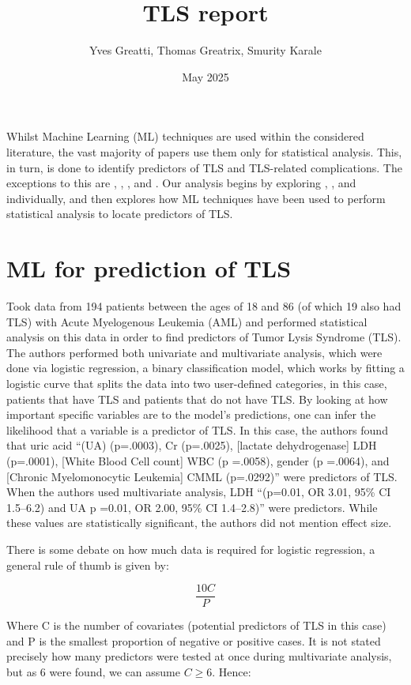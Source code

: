 \documentclass{article}
\title{TLS report}
\author{Yves Greatti, Thomas Greatrix, Smurity Karale}
\date{May 2025}
\begin{document}
\maketitle

Whilst Machine Learning (ML) techniques are used within the considered literature, the vast majority of papers use them only for statistical analysis. This, in turn, is done to identify predictors of TLS and TLS-related complications. The exceptions to this are ,  \cite{montesinos2008tumor}, \cite{mato2004predictive}, and  \cite{xiao2024prediction}. Our analysis begins by exploring \cite{montesinos2008tumor}, 
\cite{xiao2024prediction}, and  \cite{mato2004predictive} individually, and then explores how ML techniques have been used to perform statistical analysis to locate predictors of TLS.

\section{ML for prediction of TLS}

\cite{montesinos2008tumor} Took data from 194 patients between the ages of 18 and 86 (of which 19 also had TLS) with Acute Myelogenous Leukemia (AML) and performed statistical analysis on this data in order to find predictors of Tumor Lysis Syndrome (TLS). The authors performed both univariate and multivariate analysis, which were done via logistic regression, a binary classification model, which works by fitting a logistic curve that splits the data into two user-defined categories, in this case, patients that have TLS and patients that do not have TLS. By looking at how important specific variables are to the model’s predictions, one can infer the likelihood that a variable is a predictor of TLS. In this case, the authors found that uric acid “(UA) (p=.0003), Cr (p=.0025), [lactate dehydrogenase] LDH (p=.0001), [White Blood Cell count] WBC (p =.0058), gender (p =.0064), and [Chronic Myelomonocytic Leukemia] CMML (p=.0292)” were predictors of TLS. When the authors used multivariate analysis, LDH “(p=0.01, OR 3.01, 95\% CI 1.5–6.2) and UA p =0.01, OR 2.00, 95\% CI 1.4–2.8)” were predictors. While these values are statistically significant, the authors did not mention effect size.

There is some debate on how much data is required for logistic regression, a general rule of thumb is given by:

\[\frac{10C}{P}\]

Where C is the number of covariates (potential predictors of TLS in this case) and P is the smallest proportion of negative or positive cases. It is not stated precisely how many predictors were tested at once during multivariate analysis, but as 6 were found, we can assume \(C \geq 6\). Hence:
\end{document}
